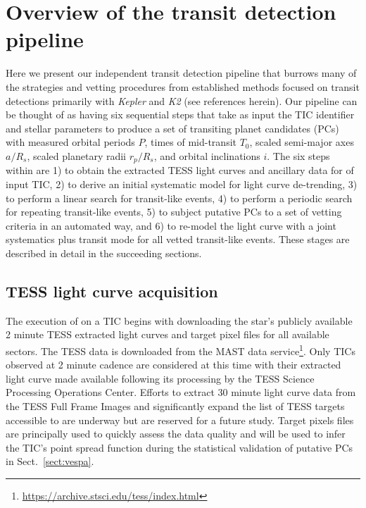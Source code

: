 \section{Overview of the \pipeline{} transit detection pipeline} \label{sect:pipe}
Here we present our independent transit detection pipeline \pipeline{} that burrows many of the strategies and
vetting procedures from established methods focused on transit detections primarily with \emph{Kepler} and
\emph{K2} (see references herein).
Our pipeline can be thought of as having six sequential steps that
take as input the TIC identifier and stellar parameters to 
produce a set of transiting planet candidates (PCs) with measured orbital periods $P$, times of mid-transit
$T_0$, scaled semi-major axes $a/R_s$, scaled planetary radii $r_p/R_s$, and orbital inclinations $i$.
The six steps within \pipeline{} are 1) to obtain the extracted TESS light curves and ancillary data for
of input TIC, 2) to derive an initial systematic model for light curve de-trending, 3) to perform a linear search
for transit-like events, 4) to perform a periodic search for repeating transit-like events, 5) to subject putative
PCs to a set of vetting criteria in an automated way, and 6) to re-model the light curve with a joint
systematics plus transit mode for all vetted transit-like events. These stages are described
in detail in the succeeding sections.


\subsection{TESS light curve acquisition}
The execution of \pipeline{} on a TIC begins with downloading the star's publicly available
2 minute TESS extracted light curves and target pixel files for all available sectors. 
The TESS data is downloaded from the MAST data service\footnote{\url{https://archive.stsci.edu/tess/index.html}}.
Only TICs observed at 2 minute cadence are considered at this time with their extracted light curve made available
following its processing by the TESS Science Processing Operations Center. Efforts to extract 30 minute light
curve data from the TESS Full Frame Images and significantly expand the list of TESS targets accessible to
\pipeline{} are underway but are reserved for a future study.
Target pixels files are principally used to quickly assess the data quality and will be used to
infer the TIC's point spread function during the statistical validation of putative PCs in Sect.~\ref{sect:vespa}.

